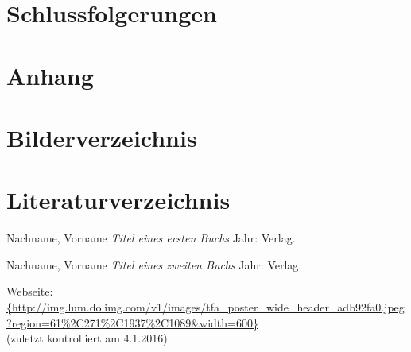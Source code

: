\documentclass[12pt,a4paper]{article} %
\begin{document}
\newpage




\section{Schlussfolgerungen}
\newpage




\appendix
\section{Anhang}
\newpage





\section{Bilderverzeichnis}
\listoffigures



\newpage
\section{Literaturverzeichnis}

\begin{thebibliography}{1} %


 Nachname, Vorname {\em Titel eines ersten Buchs} Jahr: Verlag.

 Nachname, Vorname {\em Titel eines zweiten Buchs} Jahr: Verlag.

 Webseite: \url{{http://img.lum.dolimg.com/v1/images/tfa_poster_wide_header_adb92fa0.jpeg?region=61%2C271%2C1937%2C1089&width=600}} 
\\(zuletzt kontrolliert am 4.1.2016)


\end{thebibliography}
\end{document}
